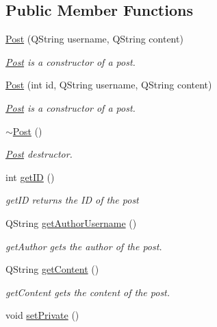 \subsection*{Public Member Functions}
\begin{DoxyCompactItemize}
\item 
\hyperlink{classPost_a3d8bd84cafa13ad2418a1af8f7cd63a7}{Post} (Q\+String username, Q\+String content)
\begin{DoxyCompactList}\small\item\em \hyperlink{classPost}{Post} is a constructor of a post. \end{DoxyCompactList}\item 
\hyperlink{classPost_a2a6f6d8ea39692835d2403b41e328627}{Post} (int id, Q\+String username, Q\+String content)
\begin{DoxyCompactList}\small\item\em \hyperlink{classPost}{Post} is a constructor of a post. \end{DoxyCompactList}\item 
\hyperlink{classPost_a6c1e585c0adb3220a154ba20d2144ae1}{$\sim$\+Post} ()\hypertarget{classPost_a6c1e585c0adb3220a154ba20d2144ae1}{}\label{classPost_a6c1e585c0adb3220a154ba20d2144ae1}

\begin{DoxyCompactList}\small\item\em \hyperlink{classPost}{Post} destructor. \end{DoxyCompactList}\item 
int \hyperlink{classPost_a5518c69784c09c1d587c0412779d58ac}{get\+ID} ()
\begin{DoxyCompactList}\small\item\em get\+ID returns the ID of the post \end{DoxyCompactList}\item 
Q\+String \hyperlink{classPost_ae1dc678542270799a01d175be2b201d3}{get\+Author\+Username} ()
\begin{DoxyCompactList}\small\item\em get\+Author gets the author of the post. \end{DoxyCompactList}\item 
Q\+String \hyperlink{classPost_a81a95c598c33f04083dfed8cb734f4ca}{get\+Content} ()
\begin{DoxyCompactList}\small\item\em get\+Content gets the content of the post. \end{DoxyCompactList}\item 
void \hyperlink{classPost_abeb9b0ed9f44f1aaed5834c6898c618f}{set\+Private} ()\hypertarget{classPost_abeb9b0ed9f44f1aaed5834c6898c618f}{}\label{classPost_abeb9b0ed9f44f1aaed5834c6898c618f}


\end{DoxyCompactItemize}
